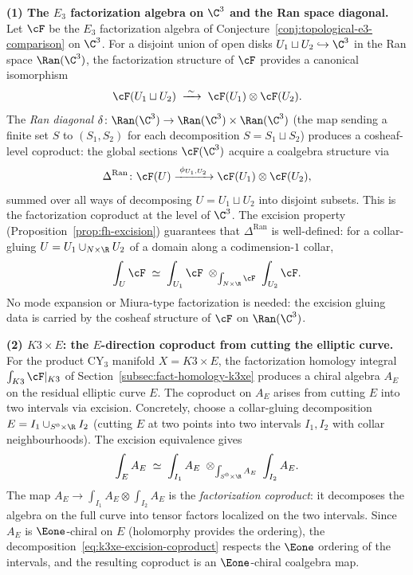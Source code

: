 \medskip
\noindent\textbf{(1) The $E_3$ factorization algebra on $\C^3$
and the Ran space diagonal.}
Let $\cF$ be the $E_3$ factorization algebra of
Conjecture~\ref{conj:topological-e3-comparison} on $\C^3$.
For a disjoint union of open disks $U_1 \sqcup U_2 \hookrightarrow \C^3$
in the Ran space $\Ran(\C^3)$, the factorization structure of $\cF$ provides
a canonical isomorphism
\[
 \cF(U_1 \sqcup U_2) \;\xrightarrow{\;\sim\;}\;
 \cF(U_1) \otimes \cF(U_2).
\]
The \emph{Ran diagonal} $\delta \colon \Ran(\C^3) \to
\Ran(\C^3) \times \Ran(\C^3)$ (the map sending a finite set $S$
to $(S_1, S_2)$ for each decomposition $S = S_1 \sqcup S_2$)
produces a cosheaf-level coproduct: the global sections
$\cF(\C^3)$ acquire a coalgebra structure via
\begin{equation}\label{eq:ran-coproduct}
 \Delta^{\mathrm{Ran}} \colon \cF(U) \xrightarrow{\;\phi_{U_1,U_2}\;}
 \cF(U_1) \otimes \cF(U_2),
\end{equation}
summed over all ways of decomposing $U = U_1 \sqcup U_2$ into disjoint
subsets. This is the factorization coproduct at the level of $\C^3$.
The excision property (Proposition~\ref{prop:fh-excision}) guarantees
that $\Delta^{\mathrm{Ran}}$ is well-defined: for a collar-gluing
$U = U_1 \cup_{N \times \R} U_2$ of a domain along a codimension-$1$
collar,
\[
 \int_U \cF \;\simeq\;
 \int_{U_1} \cF \;\otimes_{\int_{N \times \R} \cF}\;
 \int_{U_2} \cF.
\]
No mode expansion or Miura-type factorization is needed:
the excision gluing data is carried by the cosheaf structure of $\cF$
on $\Ran(\C^3)$.

\medskip
\noindent\textbf{(2) $K3 \times E$: the $E$-direction coproduct from
cutting the elliptic curve.}
For the product CY$_3$ manifold $X = K3 \times E$, the factorization
homology integral $\int_{K3} \cF|_{K3}$ of
Section~\ref{subsec:fact-homology-k3xe} produces a chiral algebra
$A_E$ on the residual elliptic curve $E$. The coproduct on $A_E$ arises
from cutting $E$ into two intervals via excision. Concretely, choose a
collar-gluing decomposition $E = I_1 \cup_{S^0 \times \R} I_2$ (cutting
$E$ at two points into two intervals $I_1, I_2$ with collar
neighbourhoods). The excision equivalence gives
\begin{equation}\label{eq:k3xe-excision-coproduct}
 \int_E A_E \;\simeq\;
 \int_{I_1} A_E \;\otimes_{\int_{S^0 \times \R} A_E}\;
 \int_{I_2} A_E.
\end{equation}
The map $A_E \to \int_{I_1} A_E \otimes \int_{I_2} A_E$ is the
\emph{factorization coproduct}: it decomposes the algebra on the
full curve into tensor factors localized on the two intervals.
Since $A_E$ is $\Eone$-chiral on $E$ (holomorphy provides the ordering),
the decomposition~\eqref{eq:k3xe-excision-coproduct} respects the $\Eone$
ordering of the intervals, and the resulting coproduct is an $\Eone$-chiral
coalgebra map.

